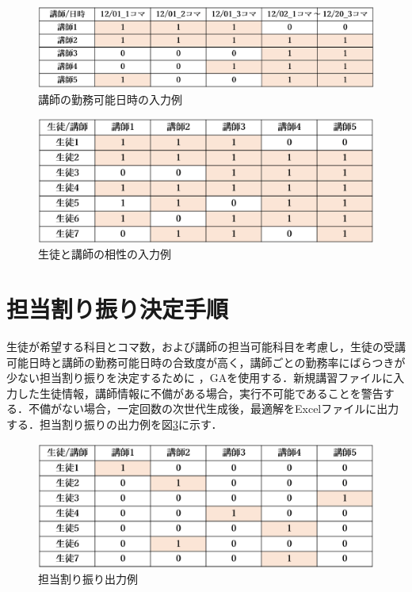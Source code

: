 \begin{figure}[htbp]
\begin{center}
\includegraphics[scale=0.5]{image/new_file/04042_4.eps}
\caption{講師の勤務可能日時の入力例}
\label{i04044}
\end{center}
\end{figure}

\begin{figure}[htbp]
\begin{center}
\includegraphics[scale=0.5]{image/new_file/04042_5.eps}
\caption{生徒と講師の相性の入力例}
\label{i04045}
\end{center}
\end{figure}
  
\section{担当割り振り決定手順}
生徒が希望する科目とコマ数，および講師の担当可能科目を考慮し，生徒の受講可能日時と講師の勤務可能日時の合致度が高く，講師ごとの勤務率にばらつきが少ない担当割り振りを決定するために
，GAを使用する．新規講習ファイルに入力した生徒情報，講師情報に不備がある場合，実行不可能であることを警告する．不備がない場合，一定回数の次世代生成後，最適解をExcelファイルに出力する．担当割り振りの出力例を図\ref{04045}に示す．

\begin{figure}[t]
\begin{center}
\includegraphics[scale=0.5]{image/new_file/04045.eps}
\caption{担当割り振り出力例}
\label{04045}
\end{center}
\end{figure}

